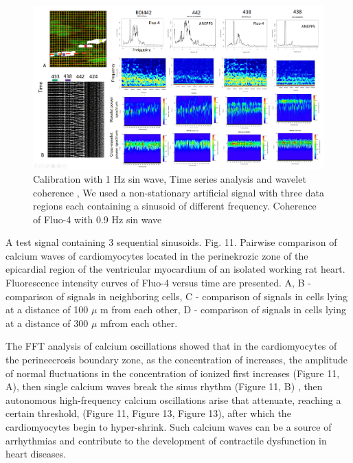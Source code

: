 \documentclass{biophys-new}
\begin{document}
\begin{figure}
    \includegraphics[width=0.9\linewidth]{fig8.png}
    \caption{Calibration with 1 Hz sin wave, Time series analysis and wavelet coherence , We used a non-stationary artificial signal with three data regions each containing a sinusoid of different frequency. Coherence of Fluo-4 with 0.9 Hz sin wave }
    \label{fig:fig8}
\end{figure}


A test signal containing 3 sequential sinusoids.
Fig. 11. Pairwise comparison of calcium waves of cardiomyocytes located in the perinekrozic zone of the epicardial region of the ventricular myocardium of an isolated working rat heart. Fluorescence intensity curves of Fluo-4 versus time are presented. A, B - comparison of signals in neighboring cells, C - comparison of signals in cells lying at a distance of 100 $\mu$ m from each other, D - comparison of signals in cells lying at a distance of 300 $\mu$  mfrom each other.


The FFT analysis of calcium oscillations showed that in the cardiomyocytes of the perineecrosis boundary zone, as the concentration of  increases, the amplitude of normal fluctuations in the concentration of ionized  first increases (Figure 11, A), then single calcium waves break the sinus rhythm (Figure 11, B) , then autonomous high-frequency calcium oscillations arise that attenuate, reaching a certain threshold, (Figure 11, Figure 13, Figure 13), after which the cardiomyocytes begin to hyper-shrink. Such calcium waves can be a source of arrhythmias and contribute to the development of contractile dysfunction in heart diseases.
\end{document}
